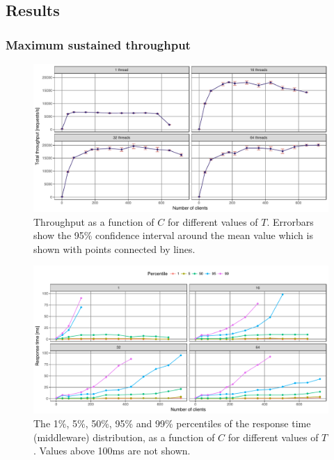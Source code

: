 \documentclass[11pt]{article}
\begin{document}
\subsection{Results}

\subsubsection{Maximum sustained throughput}

\begin{figure}[h]
\centering
\includegraphics[width=\textwidth]{../results/throughput/graphs/tp_vs_clients.pdf}
\caption{Throughput as a function of $C$ for different values of $T$. Errorbars show the 95\% confidence interval around the mean value which is shown with points connected by lines.}
\label{fig:exp1:res:throughput}
\end{figure}

\begin{figure}[h]
\centering
\includegraphics[width=\textwidth]{../results/throughput/graphs/response_time_vs_clients.pdf}
\caption{The 1\%, 5\%, 50\%, 95\% and 99\% percentiles of the response time (middleware) distribution, as a function of $C$ for different values of $T$. Values above 100ms are not shown.}
\label{fig:exp1:res:responsetime}
\end{figure}
\end{document}
